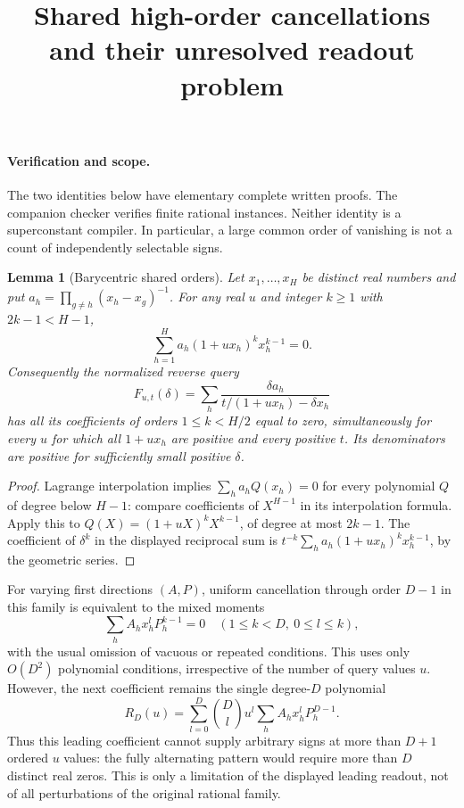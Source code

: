 \documentclass[11pt]{article}
\title{Shared high-order cancellations and their unresolved readout problem}
\author{}
\date{}
\newtheorem{lemma}{Lemma}
\begin{document}
\maketitle

\paragraph{Verification and scope.}
The two identities below have elementary complete written proofs. The
companion checker verifies finite rational instances. Neither identity
is a superconstant compiler. In particular, a large common order of
vanishing is not a count of independently selectable signs.

\begin{lemma}[Barycentric shared orders]
Let $x_1,\ldots,x_H$ be distinct real numbers and put
$a_h=\prod_{g\ne h}(x_h-x_g)^{-1}$. For any real $u$ and integer
$k\geq1$ with $2k-1<H-1$,
\[
 \sum_{h=1}^H a_h(1+ux_h)^k x_h^{k-1}=0.
\]
Consequently the normalized reverse query
\[
 F_{u,t}(\delta)=\sum_h
 \frac{\delta a_h}{t/(1+ux_h)-\delta x_h}
\]
has all its coefficients of orders $1\leq k<H/2$ equal to zero,
simultaneously for every $u$ for which all $1+ux_h$ are positive and
every positive $t$. Its denominators are positive for sufficiently
small positive $\delta$.
\end{lemma}
\begin{proof}
Lagrange interpolation implies $\sum_h a_h Q(x_h)=0$ for every
polynomial $Q$ of degree below $H-1$: compare coefficients of $X^{H-1}$
in its interpolation formula. Apply this to
$Q(X)=(1+uX)^kX^{k-1}$, of degree at most $2k-1$.
The coefficient of $\delta^k$ in the displayed reciprocal sum is
$t^{-k}\sum_h a_h(1+ux_h)^kx_h^{k-1}$, by the geometric series.
\end{proof}

For varying first directions $(A,P)$, uniform cancellation through
order $D-1$ in this family is equivalent to the mixed moments
\[
 \sum_h A_h x_h^l P_h^{k-1}=0
 \quad(1\leq k<D,\ 0\leq l\leq k),
\]
with the usual omission of vacuous or repeated conditions. This uses
only $O(D^2)$ polynomial conditions, irrespective of the number of
query values $u$. However, the next coefficient remains the single
degree-$D$ polynomial
\[
 R_D(u)=\sum_{l=0}^D\binom Dl u^l
            \sum_h A_hx_h^lP_h^{D-1}.
\]
Thus this leading coefficient cannot supply arbitrary signs at more
than $D+1$ ordered $u$ values: the fully alternating pattern would
require more than $D$ distinct real zeros. This is only a limitation
of the displayed leading readout, not of all perturbations of the
original rational family.
\end{document}
